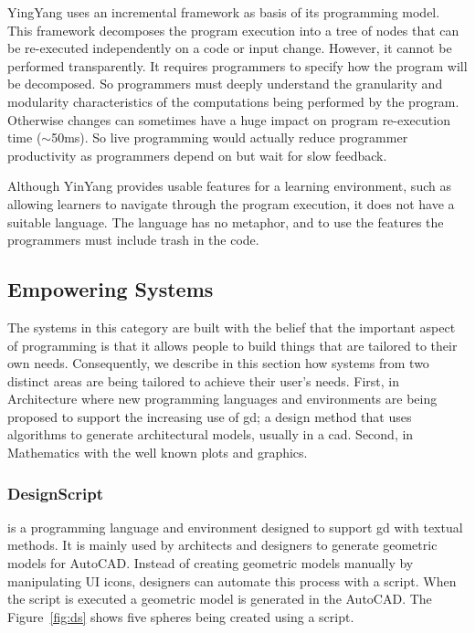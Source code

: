 YingYang uses an incremental framework as basis of its programming model. This framework decomposes the program execution into a tree of nodes that can be re-executed independently on a code or input change. However, it cannot be performed transparently. It requires programmers to specify how the program will be decomposed. So programmers must deeply understand the granularity and modularity characteristics of the computations being performed by the program. Otherwise changes can sometimes have a huge impact on program re-execution time ($\sim$50ms). So live programming would actually reduce programmer productivity as programmers depend on but wait for slow feedback.

Although YinYang provides usable features for a learning environment, such as allowing learners to navigate through the program execution, it does not have a suitable language. The language has no metaphor, and to use the features the programmers must include trash in the code. 

\subsection{Empowering Systems}

The systems in this category are built with the belief that the important aspect of programming is that it allows people to build things that are tailored to their own needs. Consequently, we describe in this section how systems from two distinct areas are being tailored to achieve their user's needs. First, in Architecture where new programming languages and environments are being proposed to support the increasing use of \ac{gd}; a design method that uses algorithms to generate architectural models, usually in a \ac{cad}. Second, in Mathematics with the well known plots and graphics. 

\subsubsection{DesignScript~\cite{aish2012designscript}} is a programming language and environment designed to support \ac{gd} with textual methods. It is mainly used by architects and designers to generate geometric models for AutoCAD. Instead of creating geometric models manually by manipulating UI icons, designers can automate this process with a script. When the script is executed a geometric model is generated in the AutoCAD. The Figure~\ref{fig:ds} shows five spheres being created using a script.

